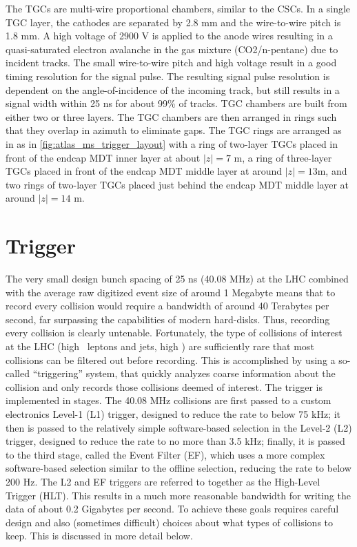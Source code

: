 The TGCs are multi-wire proportional chambers, similar to the CSCs.
In a single TGC layer, the cathodes are 
separated by 2.8 mm and the wire-to-wire pitch
is 1.8 mm.  A high voltage of 2900 V is applied to the anode wires
resulting in a quasi-saturated electron avalanche in the gas 
mixture (CO2/n-pentane) due to incident tracks.
The small wire-to-wire pitch and high voltage result in a good 
timing resolution for the signal pulse. The resulting
signal pulse resolution is dependent on the angle-of-incidence
of the incoming track, but still results in a signal width
within 25 ns for about 99\% of tracks.
TGC chambers are built from either two or three layers. 
The TGC chambers are then arranged in rings such that they overlap
in azimuth to eliminate gaps.
The TGC rings are arranged as in 
as in \fig\ref{fig:atlas_ms_trigger_layout}
with a ring of two-layer TGCs placed in front of the endcap MDT inner
layer at about $|z|=7$ m, 
a ring of three-layer TGCs placed in front of the endcap MDT
middle layer at around $|z|=13 $m, and two rings of 
two-layer TGCs placed just behind
the endcap MDT middle layer at around $|z|=14$ m.



\section{Trigger}
\label{sec:atlas_trigger}

The very small design bunch spacing 
of 25 ns (40.08 MHz) at the LHC combined with the average raw digitized event size
of around 1 Megabyte means that to record every collision
would require a bandwidth of around 40 Terabytes per second, far surpassing
the capabilities of modern hard-disks. Thus, recording every collision
is clearly untenable. Fortunately, the type of collisions of interest at the LHC 
(high \pt~leptons and jets, high \met) are sufficiently rare 
that most collisions can be filtered out before recording. 
This is accomplished by using a so-called ``triggering'' system, 
that quickly analyzes coarse information about the collision
and only records those collisions deemed of interest.
The trigger is implemented in stages. The 40.08 MHz collisions are
first passed to a custom electronics Level-1 (L1) trigger, designed
to reduce the rate to below 75 kHz; it then is passed to the 
relatively simple software-based selection in the 
Level-2 (L2) trigger, designed to reduce the rate
to no more than 3.5 kHz; finally, it is passed to the third stage,
called the Event Filter (EF), which uses a more complex software-based 
selection similar to the offline selection, reducing the 
rate to below 200 Hz. The L2 and EF triggers are referred to together
as the High-Level Trigger (HLT). This results in a much more reasonable 
bandwidth for writing the data of about 0.2 Gigabytes per second.
To achieve these goals requires careful design and also (sometimes difficult)
choices about what types of collisions to keep.  This is discussed in more
detail below. 

